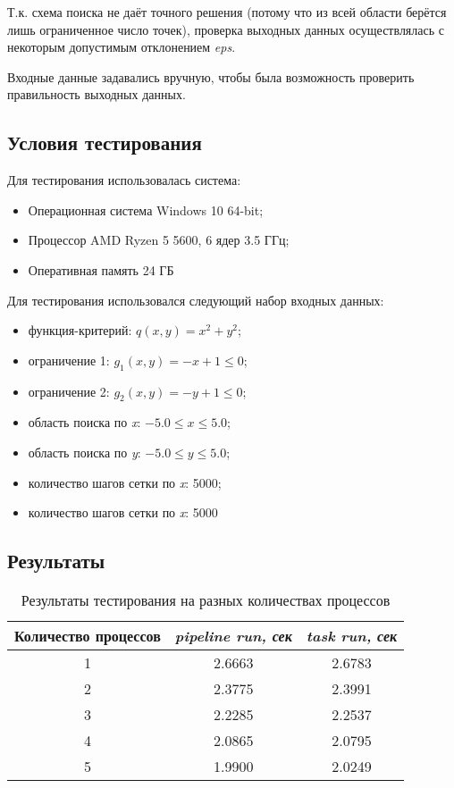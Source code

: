 \documentclass[12pt]{article}
\begin{document}
Т.к. схема поиска не даёт точного решения (потому что из всей области берётся лишь ограниченное число точек), проверка выходных данных осуществлялась с некоторым допустимым отклонением \textit{eps}.

Входные данные задавались вручную, чтобы была возможность проверить правильность выходных данных.

\subsection{Условия тестирования}
Для тестирования использовалась система:
\begin{itemize}
    \item Операционная система Windows 10 64-bit;
    \item Процессор AMD Ryzen 5 5600, 6 ядер 3.5 ГГц;
    \item Оперативная память 24 ГБ
\end{itemize}

Для тестирования использовался следующий набор входных данных:
\begin{itemize}
    \item функция-критерий: $q(x, y) = x^2 +y^2$;
    \item ограничение 1: $g_1(x, y) = -x + 1 \leq 0$;
    \item ограничение 2: $g_2(x, y) = -y + 1 \leq 0$;
    \item область поиска по \textit{x}: $-5.0 \leq x \leq 5.0$;
    \item область поиска по \textit{y}: $-5.0 \leq y \leq 5.0$;
    \item количество шагов сетки по \textit{x}: 5000;
    \item количество шагов сетки по \textit{x}: 5000
\end{itemize}

\subsection{Результаты}
\begin{table}[H]
\centering
\begin{tabular}{|c|c|c|}
\hline
\textbf{Количество процессов} & \textbf{\textit{pipeline run, сек}} & \textbf{\textit{task run, сек}} \\
\hline
1                             & 2.6663                             & 2.6783                           \\
2                             & 2.3775                             & 2.3991                           \\
3                             & 2.2285                             & 2.2537                           \\
4                             & 2.0865                             & 2.0795                           \\
5                             & 1.9900                             & 2.0249                           \\
\hline
\end{tabular}
\caption{Результаты тестирования на разных количествах процессов}
\end{table}
\end{document}
